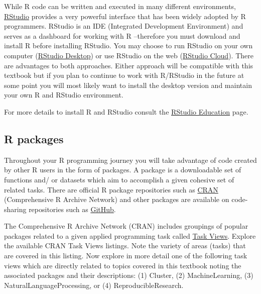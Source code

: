 \documentclass[
  letterpaper,
]{latex/krantz}
\begin{document}
While R code can be written and executed in many different environments,
\href{https://www.rstudio.com/products/rstudio/}{RStudio} provides a
very powerful interface that has been widely adopted by R programmers.
RStudio is an IDE (Integrated Development Environment) and serves as a
dashboard for working with R --therefore you must download and install R
before installing RStudio. You may choose to run RStudio on your own
computer (\href{https://www.rstudio.com/products/rstudio/}{RStudio
Desktop}) or use RStudio on the web
(\href{https://www.rstudio.com/products/cloud/}{RStudio Cloud}). There
are advantages to both approaches. Either approach will be compatible
with this textbook but if you plan to continue to work with R/RStudio in
the future at some point you will most likely want to install the
desktop version and maintain your own R and RStudio environment.

For more details to install R and RStudio consult the
\href{https://education.rstudio.com/learn/beginner/}{RStudio Education}
page.

\hypertarget{r-packages}{%
\subsection*{R packages}\label{r-packages}}

Throughout your R programming journey you will take advantage of code
created by other R users in the form of packages. A package is a
downloadable set of functions and/ or datasets which aim to accomplish a
given cohesive set of related tasks. There are official R package
repositories such as \href{https://cran.r-project.org/}{CRAN}
(Comprehensive R Archive Network) and other packages are available on
code-sharing repositories such as \href{https://github.com/}{GitHub}.

\begin{tcolorbox}[enhanced jigsaw, toprule=.15mm, bottomtitle=1mm, coltitle=black, title=\textcolor{quarto-callout-note-color}{\faInfo}\hspace{0.5em}{Consider}, left=2mm, colframe=quarto-callout-note-color-frame, bottomrule=.15mm, colbacktitle=quarto-callout-note-color!10!white, leftrule=.75mm, colback=white, titlerule=0mm, breakable, toptitle=1mm, opacityback=0, arc=.35mm, rightrule=.15mm, opacitybacktitle=0.6]

The Comprehensive R Archive Network (CRAN) includes groupings of popular
packages related to a given applied programming task called
\href{https://cran.r-project.org/web/views/}{Task Views}. Explore the
available CRAN Task Views listings. Note the variety of areas (tasks)
that are covered in this listing. Now explore in more detail one of the
following task views which are directly related to topics covered in
this textbook noting the associated packages and their descriptions: (1)
Cluster, (2) MachineLearning, (3) NaturalLanguageProcessing, or (4)
ReproducibleResearch.

\end{tcolorbox}
\end{document}
